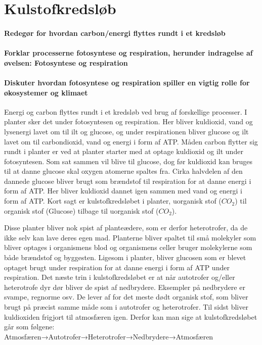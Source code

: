 \newpage
\part{Kulstofkredsløb}
\subsection*{Redegør for hvordan carbon/energi flyttes rundt i et kredsløb}
\subsection*{Forklar processerne fotosyntese og respiration, herunder indragelse af øvelsen: Fotosyntese og respiration}
\subsection*{Diskuter hvordan fotosyntese og respiration spiller en vigtig rolle for økosystemer og klimaet}
Energi og carbon flyttes rundt i et kredsløb ved brug af forskellige processer. I planter sker det under fotosyntesen og respiration. Her bliver kuldioxid, vand og lysenergi lavet om til ilt og glucose, og under respirationen bliver glucose og ilt lavet om til carbondioxid, vand og energi i form af ATP. Måden carbon flytter sig rundt i planter er ved at planter starter med at optage kuldioxid og ilt under fotosyntesen. Som sat sammen vil blive til glucose, dog før kuldioxid kan bruges til at danne glucose skal oxygen atomerne spaltes fra. Cirka halvdelen af den dannede glucose bliver brugt som brændstof til respiration for at danne energi i form af ATP. Her bliver kuldioxid dannet igen sammen med vand og energi i form af ATP. Kort sagt er kulstofkredsløbet i planter, uorganisk stof (\begin{math}CO_2\end{math}) til organisk stof (Glucose) tilbage til uorganisk stof (\begin{math}CO_2\end{math}).

Disse planter bliver nok spist af planteædere, som er derfor heterotrofer, da de ikke selv kan lave deres egen mad. Planterne bliver spaltet til små molekyler som bliver optages i organismens blod og organismens celler bruger molekylerne som både brændstof og byggesten. Ligesom i planter, bliver glucosen som er blevet optaget brugt under respiration for at danne energi i form af ATP under respiration. 
Det næste trin i kulstofkredsløbet er at når autotrofer og/eller heterotrofe dyr dør bliver de spist af nedbrydere. Eksempler på nedbrydere er svampe, regnorme osv.  De lever af for det meste dødt organisk stof, som bliver brugt på præcist samme måde som i autotrofer og heterotrofer. Til sidst bliver kuldioxiden frigjort til atmosfæren igen. Derfor kan man sige at kulstofkredsløbet går som følgene: Atmosfæren→Autotrofer→Heterotrofer→Nedbrydere→Atmosfæren

